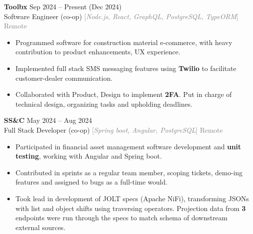 \documentclass[9pt]{developercv} %
\begin{document}
\begin{minipage}[t]{\textwidth}
	\vspace{-\baselineskip}

	\textbf{Toolbx} \hfill Sep 2024 -- Present (Dec 2024) \\
	Software Engineer (co-op) \quad \textcolor{gray}{[\;\textit{Node.js, React, GraphQL, PostgreSQL, TypeORM}\;]} \hfill \textcolor{gray}{Remote}
	\begin{itemize}[noitemsep,topsep=0pt]
		\item Programmed software for construction material e-commerce,
		with heavy contribution to product enhancements, UX experience.
		\item Implemented full stack SMS messaging features using \textbf{Twilio} to facilitate customer-dealer communication.
		\item Collaborated with Product, Design to implement \textbf{2FA}. Put in charge of technical design, organizing tasks and upholding deadlines.
	\end{itemize}
	\vspace{0.3em}

	\textbf{SS\&C} \hfill May 2024 -- Aug 2024 \\
	Full Stack Developer (co-op) \quad \textcolor{gray}{[\;\textit{Spring boot, Angular, PostgreSQL}\;]} \hfill \textcolor{gray}{Remote}
	\begin{itemize}[noitemsep,topsep=0pt]
		\item Participated in financial asset management software development and \textbf{unit testing}, working with Angular and Spring boot.
		\item Contributed in sprints as a regular team member, scoping tickets, demo-ing features and assigned to bugs as a full-time would.
		\item Took lead in development of JOLT specs (Apache NiFi), transforming JSONs with list and object shifts using traversing operators.
		Projection data from \textbf{3} endpoints were run through the specs to match schema of downstream external sources.
	\end{itemize}
	\vspace{0.3em}


\end{minipage}
\end{document}
